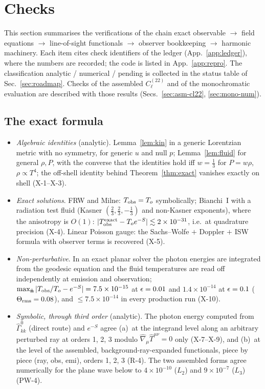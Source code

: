 \section{Checks}
\label{sec:checks}
This section summarises the verifications of the chain exact observable $\to$ field equations $\to$ line-of-sight functionals
$\to$ observer bookkeeping $\to$ harmonic machinery.  Each item cites check identifiers of the ledger (App.~\ref{app:ledger}), where the
numbers are recorded; the code is listed in App.~\ref{app:repro}.  The classification analytic / numerical / pending is collected in the
status table of Sec.~\ref{sec:roadmap}.  Checks of the assembled $C^{(22)}_\ell$ and of the monochromatic evaluation are described with
those results (Secs.~\ref{sec:asm-cl22}, \ref{sec:mono-num}).

\subsection{The exact formula}
\label{sec:check_exact}
\begin{itemize}\itemsep2pt
\item \emph{Algebraic identities} (analytic).  Lemma~\ref{lem:kin} in a generic Lorentzian metric with no symmetry, for generic $u$ and
null $p$; Lemma~\ref{lem:fluid} for general $\rho,P$, with the converse that the identities hold iff $w=\tfrac13$ for $P=w\rho$,
$\rho\propto T^4$; the off-shell identity behind Theorem~\ref{thm:exact} vanishes exactly on shell (X-1--X-3).
\item \emph{Exact solutions}.  FRW and Milne: $T_{\rm obs}=T_o$ symbolically; Bianchi~I with a radiation test fluid (Kasner
$(\tfrac23,\tfrac23,-\tfrac13)$ and non-Kasner exponents), where the anisotropy is $O(1)$: $|T_{\rm obs}^{\rm exact}-T_oe^{-S}|\lesssim2\times10^{-31}$,
i.e.\ at quadrature precision (X-4).  Linear Poisson gauge: the Sachs--Wolfe $+$ Doppler $+$ ISW formula with observer terms is
recovered (X-5).
\item \emph{Non-perturbative}.  In an exact planar solver the photon energies are integrated from the geodesic equation and the
fluid temperatures are read off independently at emission and observation; $\max_{\hat{\mathbf n}}|T_{\rm obs}/T_o-e^{-S}|=7.5\times10^{-15}$ at $\epsilon=0.01$ and
$1.4\times10^{-14}$ at $\epsilon=0.1$ ($\Theta_{\rm rms}=0.08$), and $\le7.5\times10^{-14}$ in every production run (X-10).
\item \emph{Symbolic, through third order} (analytic).  The photon energy computed from $\hat\Gamma^0_{kk}$ (direct route) and $e^{-S}$ agree
(a)~at the integrand level along an arbitrary perturbed ray at orders 1, 2, 3 modulo $\hat\nabla_\mu\hat T^{\mu\nu}=0$ only (X-7--X-9), and
(b)~at the level of the assembled, background-ray-expanded functionals, piece by piece (ray, obs, emi), orders 1, 2, 3 (R-4).  The
two assembled forms agree numerically for the plane wave below to $4\times10^{-10}$ ($L_2$) and $9\times10^{-7}$ ($L_3$) (PW-4).
\end{itemize}

